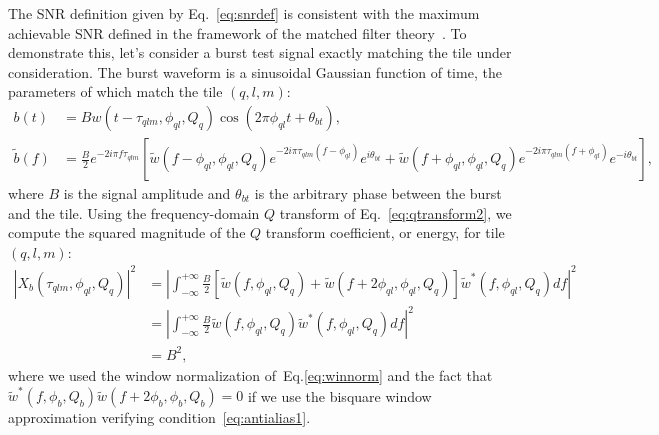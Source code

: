 The SNR definition given by Eq.~\ref{eq:snrdef} is consistent with the maximum achievable SNR defined in the framework of the matched filter theory~\cite{helstrom:1968}. To demonstrate this, let's consider a burst test signal exactly matching the tile under consideration. The burst waveform is a sinusoidal Gaussian function of time, the parameters of which match the tile $(q,l,m)$:
\begin{align}
  b(t) &= Bw(t-\tau_{qlm}, \phi_{ql}, Q_q)\cos(2\pi\phi_{ql} t + \theta_{bt}), \label{eq:sg_wave}\\
  \tilde{b}(f) &= \frac{B}{2}e^{-2i\pi f\tau_{qlm}}\left[ \tilde{w}(f-\phi_{ql},\phi_{ql},Q_q)e^{-2i\pi\tau_{qlm}(f-\phi_{ql})}e^{i\theta_{bt}}+\tilde{w}(f+\phi_{ql},\phi_{ql},Q_q)e^{-2i\pi\tau_{qlm}(f+\phi_{ql})}e^{-i\theta_{bt}}\right],
\end{align}
where $B$ is the signal amplitude and $\theta_{bt}$ is the arbitrary phase between the burst and the tile. Using the frequency-domain $Q$ transform of Eq.~\ref{eq:qtransform2}, we compute the squared magnitude of the $Q$ transform coefficient, or energy, for tile $(q,l,m)$:
\begin{align}
  |X_b(\tau_{qlm}, \phi_{ql}, Q_q)|^2 &= \left|\int_{-\infty}^{+\infty}{ \frac{B}{2}\left[ \tilde{w}(f,\phi_{ql},Q_q)+\tilde{w}(f+2\phi_{ql},\phi_{ql},Q_q)\right] \tilde{w}^{*}(f,\phi_{ql},Q_q) df} \right|^2\\
  &= \left|\int_{-\infty}^{+\infty}{ \frac{B}{2} \tilde{w}(f,\phi_{ql},Q_q) \tilde{w}^{*}(f,\phi_{ql},Q_q) df}\right|^2 \\
  &= B^2,
  \label{eq:qtransform_signal}
\end{align}
where we used the window normalization of~Eq.\ref{eq:winnorm} and the fact that $\tilde{w}^{*}(f,\phi_b,Q_b)\tilde{w}(f+2\phi_b,\phi_b,Q_b)=0$ if we use the bisquare window approximation verifying condition~\ref{eq:antialias1}.

